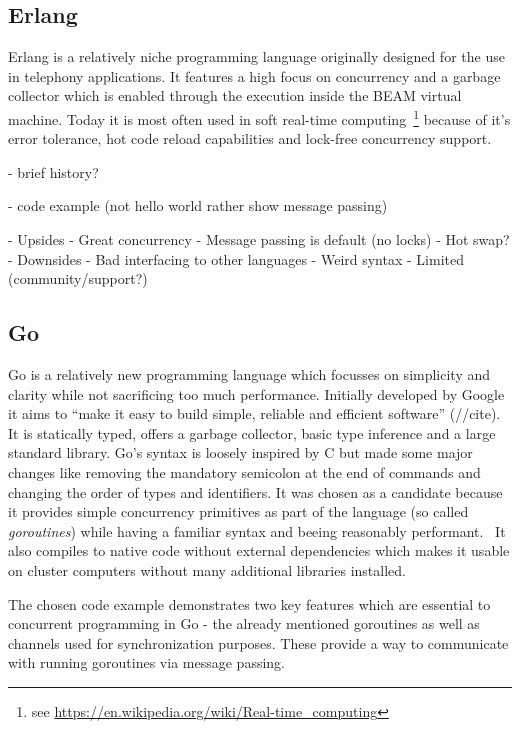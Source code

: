 \subsection*{Erlang}
\label{subsec:State_of_the_art::Candidates::Erlang}
Erlang is a relatively niche programming language originally designed for the use in telephony applications. It features a high focus on concurrency and a garbage collector which is enabled through the execution inside the BEAM virtual machine. Today it is most often used in soft real-time computing~\footnote{see \url{https://en.wikipedia.org/wiki/Real-time_computing}} because of it's error tolerance, hot code reload capabilities and lock-free concurrency support.

- brief history?

- code example (not hello world rather show message passing)

- Upsides
    - Great concurrency
    - Message passing is default (no locks)
    - Hot swap?
- Downsides
    - Bad interfacing to other languages
    - Weird syntax
    - Limited (community/support?)


\subsection*{Go}
\label{subsec:State_of_the_art::Candidates::Go}
Go is a relatively new programming language which focusses on simplicity and clarity while not sacrificing too much performance. Initially developed by Google it aims to ``make it easy to build simple, reliable and efficient software'' (//cite). It is statically typed, offers a garbage collector, basic type inference and a large standard library. Go's syntax is loosely inspired by C but made some major changes like removing the mandatory semicolon at the end of commands and changing the order of types and identifiers. It was chosen as a candidate because it provides simple concurrency primitives as part of the language (so called \textit{goroutines}) while having a familiar syntax and beeing reasonably performant.~\cite{intro_go} It also compiles to native code without external dependencies which makes it usable on cluster computers without many additional libraries installed.

The chosen code example demonstrates two key features which are essential to concurrent programming in Go - the already mentioned goroutines as well as channels used for synchronization purposes. These provide a way to communicate with running goroutines via message passing.
\\


